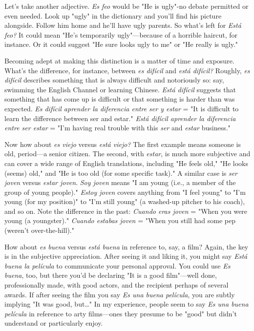 \documentclass[14pt,a4paper,oneside]{memoir}
\begin{document}
Let's take another adjective. \emph{Es feo} would be "He is ugly"-no
debate permitted or even needed. Look up "ugly" in the dictionary and
you'll find his picture alongside. Follow him home and he'll have ugly
parents. So what's left for \emph{Está feo?} It could mean "He's temporarily
ugly"---because of a horrible haircut, for instance. Or it could suggest
"He sure looks ugly to me" or "He really is ugly."

Becoming adept at making this distinction is a matter of time
and exposure. What's the difference, for instance, between \emph{es difícil}
and \emph{está difícil?} Roughly, \emph{es difícil} describes something that is always
difficult and notoriously so: say, swimming the English Channel or
learning Chinese. \emph{Está difícil} suggests that something that has come
up is difficult or that something is harder than was expected. \emph{Es difícil aprender la diferencia entre ser y estar}
 = "It is difficult to learn the
 difference between ser and estar." \emph{Está difícil aprender la diferencia
 entre ser estar} = "I'm having real trouble with this \emph{ser} and \emph{estar}
business."

Now how about \emph{es viejo} versus \emph{está viejo?} The first example
means someone is old, period---a senior citizen. The second, with
\emph{estar}, is much more subjective and can cover a wide range of English
translations, including "He feels old," "He looks (seems) old," and
"He is too old (for some specific task)." A similar case is \emph{ser joven}
versus \emph{estar joven}. \emph{Soy joven} means "I am young (i.e., a member
of the group of young people)." \emph{Estoy joven} covers anything from "I
feel young" to "I'm young (for my position)" to "I'm still young" (a
washed-up pitcher to his coach), and so on. Note the difference in the
past: \emph{Cuando eras joven} = "When you were young (a youngster)."
\emph{Cuando estabas joven} = "When you still had some pep (weren't over-the-hill)."

How about \emph{es buena} versus \emph{está buena} in reference to, say, a
film? Again, the key is in the subjective appreciation. After seeing it
and liking it, you might say \emph{Está buena la película} to communicate
your personal approval. You could use \emph{Es buena}, too, but there you'd
be declaring "It is a good film"---well done, professionally made, with
good actors, and the recipient perhaps of several awards. If after seeing
the film you say \emph{Es una buena película}, you are subtly implying "It
was good, but\ldots{}" In my experience, people seem to say \emph{Es una
buena película} in reference to arty films---ones they presume to be
"good" but didn't understand or particularly enjoy.
\end{document}
